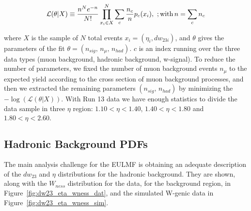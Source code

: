 \begin{equation} 
  \mathcal{L}(\theta|X) 
  \equiv
  \frac{n^N e^{-n}}{N!} \prod_{x_i \in X}^N
  \sum_c \frac{n_c}{n} p_c (x_i), \
  ;{\rm with}\, 
  n=\sum_c n_c 
  \label{eq:likelihood_function}
\end{equation} 

where $X$ is the sample of $N$ total events $x_i = (\eta_i,dw_{23i})$, and
$\theta$ gives the parameters of the fit $\theta = (n_{sig},\,n_\mu,\,
n_{had})$.  $c$ is an index running over the three data types (muon background,
hadronic background, w-signal). To reduce the number of parameters, we fixed the
number of muon background events $n_\mu$ to the expected yield according to the
cross section of muon background processes, and then we extracted the remaining
parameters $(n_{sig},\, n_{had})$ by minimizing the
$-\log(\mathcal{L}(\theta|X))$.  With Run 13 data we have enough statistics to
divide the data sample in three $\eta$ region: $1.10 < \eta < 1.40$, $1.40 <
\eta < 1.80$ and $1.80 < \eta < 2.60$. 

\subsection{Hadronic Background PDFs}

The main analysis challenge for the EULMF is obtaining an adequate description
of the $dw_{23}$ and $\eta$ distributions for the hadronic background. They are
shown, along with the $W_{ness}$ distribution for the data, for the background
region, in Figure~\ref{fig:dw23_eta_wness_dat}, and the simulated W-genic data
in Figure~\ref{fig:dw23_eta_wness_sim}.

